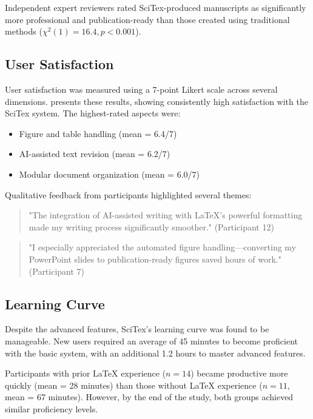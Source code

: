 Independent expert reviewers rated SciTex-produced manuscripts as significantly more professional and publication-ready than those created using traditional methods ($\chi^2(1) = 16.4, p < 0.001$).

\subsection{User Satisfaction}

User satisfaction was measured using a 7-point Likert scale across several dimensions.  presents these results, showing consistently high satisfaction with the SciTex system. The highest-rated aspects were:

\begin{itemize}
    \item Figure and table handling (mean = 6.4/7)
    \item AI-assisted text revision (mean = 6.2/7)
    \item Modular document organization (mean = 6.0/7)
\end{itemize}

Qualitative feedback from participants highlighted several themes:

\begin{quote}
"The integration of AI-assisted writing with LaTeX's powerful formatting made my writing process significantly smoother." (Participant 12)
\end{quote}

\begin{quote}
"I especially appreciated the automated figure handling—converting my PowerPoint slides to publication-ready figures saved hours of work." (Participant 7)
\end{quote}

\subsection{Learning Curve}

Despite the advanced features, SciTex's learning curve was found to be manageable. New users required an average of 45 minutes to become proficient with the basic system, with an additional 1.2 hours to master advanced features. 

Participants with prior LaTeX experience ($n = 14$) became productive more quickly (mean = 28 minutes) than those without LaTeX experience ($n = 11$, mean = 67 minutes). However, by the end of the study, both groups achieved similar proficiency levels.

